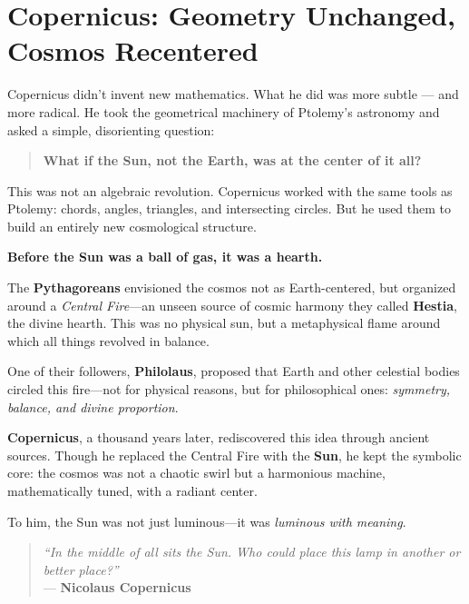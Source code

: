 \section{Copernicus: Geometry Unchanged, Cosmos Recentered}

Copernicus didn’t invent new mathematics. What he did was more subtle — and more radical. He took the geometrical machinery of Ptolemy’s astronomy and asked a simple, disorienting question:

\begin{quote}
\textbf{What if the Sun, not the Earth, was at the center of it all?}
\end{quote}

This was not an algebraic revolution. Copernicus worked with the same tools as Ptolemy: chords, angles, triangles, and intersecting circles. But he used them to build an entirely new cosmological structure.

\begin{tcolorbox}[title=The Sun as a Divine Center, colback=gray!5, colframe=black, fonttitle=\bfseries]

  \textbf{Before the Sun was a ball of gas, it was a hearth.}
  
  The \textbf{Pythagoreans} envisioned the cosmos not as Earth-centered, but organized around a \textit{Central Fire}—an unseen source of cosmic harmony they called \textbf{Hestia}, the divine hearth. This was no physical sun, but a metaphysical flame around which all things revolved in balance.
  
  One of their followers, \textbf{Philolaus}, proposed that Earth and other celestial bodies circled this fire—not for physical reasons, but for philosophical ones: \textit{symmetry, balance, and divine proportion}.
  
  \textbf{Copernicus}, a thousand years later, rediscovered this idea through ancient sources. Though he replaced the Central Fire with the \textbf{Sun}, he kept the symbolic core: the cosmos was not a chaotic swirl but a harmonious machine, mathematically tuned, with a radiant center.
  
  To him, the Sun was not just luminous—it was \textit{luminous with meaning}.
  
  \begin{quote}
  \textit{“In the middle of all sits the Sun. Who could place this lamp in another or better place?”} \\
  — \textbf{Nicolaus Copernicus}
  \end{quote}
  
\end{tcolorbox}

